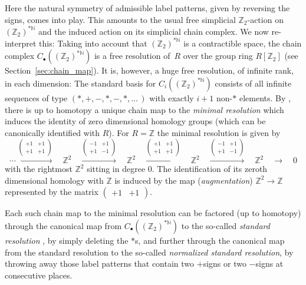 \documentclass[11pt,a4paper,draft]{article}
\newcommand{\Z}{{\mathbb Z}}
\newcommand{\N}{{\mathbb N}}
\theoremstyle{definition}
\begin{document}
Here the natural symmetry of admissible label patterns, given by reversing
the signs, comes into play. This amounts to the usual free simplicial $\Z_2$-action
on $(\Z_2)^{*\N}$ and the induced action
on its simplicial chain complex. We now re-interpret this: Taking into account that $(\Z_2)^{*\N}$ 
is a contractible space, the chain complex $C_\bullet((\Z_2)^{*\N})$ is a
free resolution of~$R$ over the group ring $R[\Z_2]$ (see Section~\ref{sec:chain_map}).
It is, however, a huge free resolution, of infinite rank, in each
dimension: The standard basis for $C_i((\Z_2)^{*\N})$
consists of all infinite sequences of type
$({*},{+},{-},{*},{-},{*},\dots\,)$ with exactly $i+1$ non-$*$
elements. By \cite[Lemma~7.4]{brown82:_cohom_group}, there is up to homotopy
a unique chain map  to the \emph{minimal resolution}  which
induces the identity of zero dimensional homology groups (which can be canonically
identified with $R$). For $R = \Z$ the minimal resolution is given by
\[
\cdots
     \stackrel{\left(\begin{smallmatrix}+1&+1\\+1&+1\end{smallmatrix}\right)}\longrightarrow\quad
\Z^2
\quad\stackrel{\left(\begin{smallmatrix}-1&+1\\+1&-1\end{smallmatrix}\right)}\longrightarrow\quad
\Z^2
\quad\stackrel{\left(\begin{smallmatrix}+1&+1\\+1&+1\end{smallmatrix}\right)}\longrightarrow\quad
\Z^2
\quad\stackrel{\left(\begin{smallmatrix}-1&+1\\+1&-1\end{smallmatrix}\right)}\longrightarrow\quad
\Z^2  \quad \longrightarrow \quad 0
\]
with the rightmost $\Z^2$ sitting in degree $0$.
The identification of its zeroth dimensional homology
with $\Z$ is induced by
the map ({\em augmentation}) $\Z^2 \to \Z$ represented by the matrix
$\left( \begin{matrix} +1 & +1 \end{matrix} \right)$.

Each such chain map to the minimal resolution can be factored (up to homotopy) through
the canonical map from $C_\bullet((\Z_2)^{*\N})$ to the so-called {\em standard
resolution} \cite[Sect.~I.5]{brown82:_cohom_group}, by simply deleting the $*$s,
and further through the canonical map from the standard resolution
to the so-called {\em normalized standard resolution}, by throwing away those label
patterns that contain two $+$signs or two $-$signs at consecutive places.
\end{document}
